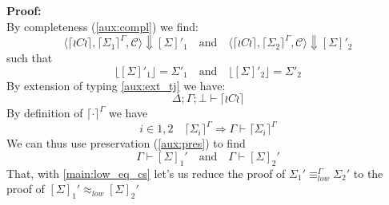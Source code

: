 \documentclass[12pt,a4paper,twoside]{book}
\begin{document}
\noindent\textbf{Proof:}\\
By completeness (\ref{aux:compl}) we find:
$$
	\langle \lceil \wr C \wr \rceil, \lceil \Sigma_1 \rceil^\Gamma, \mathscr{C}\rangle \Downarrow [\Sigma]'_1 \quad \text{and} \quad
	\langle \lceil \wr C \wr \rceil, \lceil \Sigma_2 \rceil^\Gamma, \mathscr{C}\rangle \Downarrow [\Sigma]'_2
$$
such that
\begin{equation}\label{main:low_eq_cs}
\lfloor [\Sigma]'_1 \rfloor = \Sigma'_1 \quad \text{and} \quad
\lfloor [\Sigma]'_2 \rfloor = \Sigma'_2
\end{equation}
By extension of typing \ref{aux:ext_tj} we have:
$$\Delta;\Gamma;\bot \vdash \lceil \wr C \wr \rceil$$
By definition of $\lceil \cdot \rceil^\Gamma$ we have
$$
i \in {1,2} \quad \lceil \Sigma_i \rceil^\Gamma \Rightarrow
\Gamma \vdash \lceil \Sigma_i \rceil^\Gamma
$$
We can thus use preservation (\ref{aux:pres}) to find
$$
\Gamma \vdash [\Sigma]_1' \quad \text{and} \quad \Gamma \vdash [\Sigma]_2'
$$
That, with \ref{main:low_eq_cs} let's us reduce the proof of $
\Sigma_1' \equiv_{low}^\Gamma \Sigma_2'$ to the proof of
$ [\Sigma]_1' \approx_{low} [\Sigma]_2' $
\end{document}
